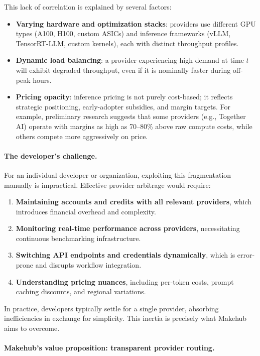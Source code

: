 \documentclass[english]{article}
\begin{document}
This lack of correlation is explained by several factors:
\begin{itemize}
    \item \textbf{Varying hardware and optimization stacks}: providers use different GPU types (A100, H100, custom ASICs) and inference frameworks (vLLM, TensorRT-LLM, custom kernels), each with distinct throughput profiles.
    \item \textbf{Dynamic load balancing}: a provider experiencing high demand at time $t$ will exhibit degraded throughput, even if it is nominally faster during off-peak hours.
    \item \textbf{Pricing opacity}: inference pricing is not purely cost-based; it reflects strategic positioning, early-adopter subsidies, and margin targets. For example, preliminary research suggests that some providers (e.g., Together AI) operate with margins as high as 70--80\% above raw compute costs, while others compete more aggressively on price.
\end{itemize}

\paragraph{The developer's challenge.}

For an individual developer or organization, exploiting this fragmentation manually is impractical. Effective provider arbitrage would require:
\begin{enumerate}
    \item \textbf{Maintaining accounts and credits with all relevant providers}, which introduces financial overhead and complexity.
    \item \textbf{Monitoring real-time performance across providers}, necessitating continuous benchmarking infrastructure.
    \item \textbf{Switching API endpoints and credentials dynamically}, which is error-prone and disrupts workflow integration.
    \item \textbf{Understanding pricing nuances}, including per-token costs, prompt caching discounts, and regional variations.
\end{enumerate}

In practice, developers typically settle for a single provider, absorbing inefficiencies in exchange for simplicity. This inertia is precisely what Makehub aims to overcome.

\paragraph{Makehub's value proposition: transparent provider routing.}
\end{document}
